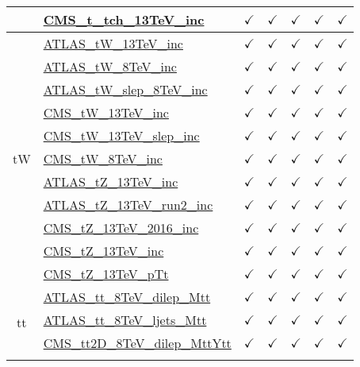 \documentclass{article}
\begin{document}
\begin{longtable}{|c|l|c|c|c|c|c|}
 & \href{https://arxiv.org}{CMS_t_tch_13TeV_inc}  & $\checkmark$ & $\checkmark$ & $\checkmark$ & $\checkmark$ & $\checkmark$
\\ \hline
\multirow{11}{*}{tW}
 & \href{https://arxiv.org}{ATLAS_tW_13TeV_inc}  & $\checkmark$ & $\checkmark$ & $\checkmark$ & $\checkmark$ & $\checkmark$\\ \cline{2-7}
 & \href{https://arxiv.org}{ATLAS_tW_8TeV_inc}  & $\checkmark$ & $\checkmark$ & $\checkmark$ & $\checkmark$ & $\checkmark$\\ \cline{2-7}
 & \href{https://arxiv.org}{ATLAS_tW_slep_8TeV_inc}  & $\checkmark$ & $\checkmark$ & $\checkmark$ & $\checkmark$ & $\checkmark$\\ \cline{2-7}
 & \href{https://arxiv.org}{CMS_tW_13TeV_inc}  & $\checkmark$ & $\checkmark$ & $\checkmark$ & $\checkmark$ & $\checkmark$\\ \cline{2-7}
 & \href{https://arxiv.org}{CMS_tW_13TeV_slep_inc}  & $\checkmark$ & $\checkmark$ & $\checkmark$ & $\checkmark$ & $\checkmark$\\ \cline{2-7}
 & \href{https://arxiv.org}{CMS_tW_8TeV_inc}  & $\checkmark$ & $\checkmark$ & $\checkmark$ & $\checkmark$ & $\checkmark$\\ \cline{2-7}
 & \href{https://arxiv.org}{ATLAS_tZ_13TeV_inc}  & $\checkmark$ & $\checkmark$ & $\checkmark$ & $\checkmark$ & $\checkmark$\\ \cline{2-7}
 & \href{https://arxiv.org}{ATLAS_tZ_13TeV_run2_inc}  & $\checkmark$ & $\checkmark$ & $\checkmark$ & $\checkmark$ & $\checkmark$\\ \cline{2-7}
 & \href{https://arxiv.org}{CMS_tZ_13TeV_2016_inc}  & $\checkmark$ & $\checkmark$ & $\checkmark$ & $\checkmark$ & $\checkmark$\\ \cline{2-7}
 & \href{https://arxiv.org}{CMS_tZ_13TeV_inc}  & $\checkmark$ & $\checkmark$ & $\checkmark$ & $\checkmark$ & $\checkmark$\\ \cline{2-7}
 & \href{https://arxiv.org}{CMS_tZ_13TeV_pTt}  & $\checkmark$ & $\checkmark$ & $\checkmark$ & $\checkmark$ & $\checkmark$
\\ \hline
\multirow{17}{*}{tt}
 & \href{https://arxiv.org}{ATLAS_tt_8TeV_dilep_Mtt}  & $\checkmark$ & $\checkmark$ & $\checkmark$ & $\checkmark$ & $\checkmark$\\ \cline{2-7}
 & \href{https://arxiv.org}{ATLAS_tt_8TeV_ljets_Mtt}  & $\checkmark$ & $\checkmark$ & $\checkmark$ & $\checkmark$ & $\checkmark$\\ \cline{2-7}
 & \href{https://arxiv.org}{CMS_tt2D_8TeV_dilep_MttYtt}  & $\checkmark$ & $\checkmark$ & $\checkmark$ & $\checkmark$ & $\checkmark$\\ \cline{2-7}

\end{longtable}
\end{document}
